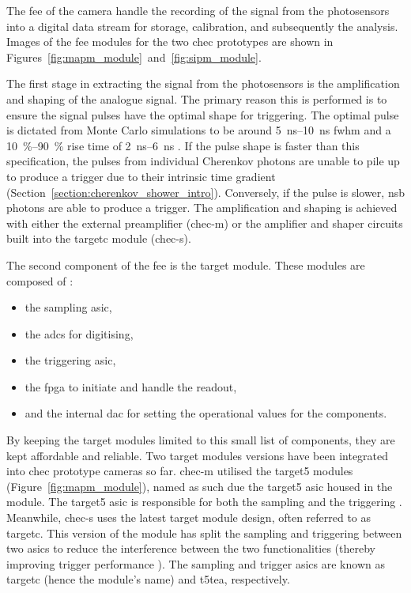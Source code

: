 The \gls{fee} of the camera handle the recording of the signal from the photosensors into a digital data stream for storage, calibration, and subsequently the analysis. Images of the \gls{fee} modules for the two \gls{chec} prototypes are shown in Figures~\ref{fig:mapm_module}~and~\ref{fig:sipm_module}.

The first stage in extracting the signal from the photosensors is the amplification and shaping of the analogue signal. The primary reason this is performed is to ensure the signal pulses have the optimal shape for triggering. The optimal pulse is dictated from Monte Carlo simulations to be around \SIrange{5}{10}{ns} \gls{fwhm} and a \SIrange{10}{90}{\percent} rise time of \SIrange{2}{6}{ns} \cite{Zorn2017}. If the pulse shape is faster than this specification, the pulses from individual Cherenkov photons are unable to pile up to produce a trigger due to their intrinsic time gradient (Section~\ref{section:cherenkov_shower_intro}). Conversely, if the pulse is slower, \gls{nsb} photons are able to produce a trigger. The amplification and shaping is achieved with either the external preamplifier (\gls{chec-m}) or the amplifier and shaper circuits built into the \gls{targetc} module (\gls{chec-s}).

The second component of the \gls{fee} is the \gls{target} module. These modules are composed of \cite{Funk2017}: 
\begin{itemize}
\item the sampling \gls{asic},
\item the \glspl{adc} for digitising,
\item the triggering \gls{asic},
\item the \gls{fpga} to initiate and handle the readout,
\item and the internal \gls{dac} for setting the operational values for the components.
\end{itemize}
By keeping the \gls{target} modules limited to this small list of components, they are kept affordable and reliable. Two \gls{target} modules versions have been integrated into \gls{chec} prototype cameras so far. \gls{chec-m} utilised the \gls{target5} modules (Figure~\ref{fig:mapm_module}), named as such due the \gls{target5} \gls{asic} housed in the module. The \gls{target5} \gls{asic} is responsible for both the sampling and the triggering \cite{Albert2017}. Meanwhile, \gls{chec-s} uses the latest \gls{target} module design, often referred to as \gls{targetc}. This version of the module has split the sampling and triggering between two \glspl{asic} to reduce the interference between the two functionalities (thereby improving trigger performance \cite{Funk2017}). The sampling and trigger \glspl{asic} are known as \gls{targetc} (hence the module's name) and \gls{t5tea}, respectively.


